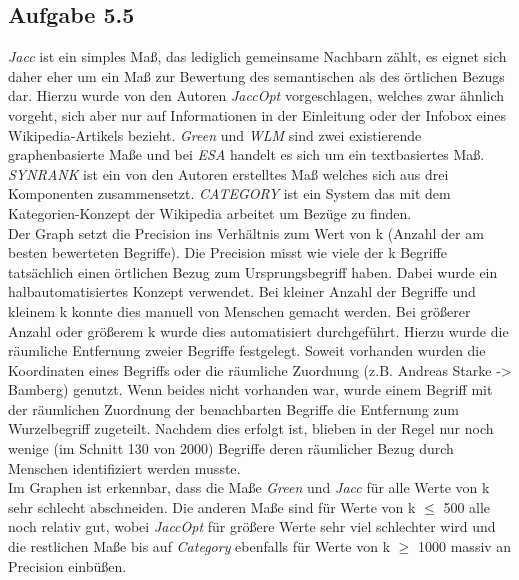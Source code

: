 \subsection*{Aufgabe 5.5}
\textit{Jacc} ist ein simples Maß, das lediglich gemeinsame Nachbarn zählt, es eignet sich daher eher um ein Maß zur Bewertung des semantischen als des örtlichen Bezugs dar. Hierzu wurde von den Autoren \textit{JaccOpt} vorgeschlagen, welches zwar ähnlich vorgeht, sich aber nur auf Informationen in der Einleitung oder der Infobox eines Wikipedia-Artikels bezieht. \textit{Green} und \textit{WLM} sind zwei existierende graphenbasierte Maße und bei \textit{ESA} handelt es sich um ein textbasiertes Maß. \textit{SYNRANK} ist ein von den Autoren erstelltes Maß welches sich aus drei Komponenten zusammensetzt. \textit{CATEGORY} ist ein System das mit dem Kategorien-Konzept der Wikipedia arbeitet um Bezüge zu finden.\\
Der Graph setzt die Precision ins Verhältnis zum Wert von k (Anzahl der am besten bewerteten Begriffe). Die Precision misst wie viele der k Begriffe tatsächlich einen örtlichen Bezug zum Ursprungsbegriff haben. Dabei wurde ein halbautomatisiertes Konzept verwendet. Bei kleiner Anzahl der Begriffe und kleinem k konnte dies manuell von Menschen gemacht werden. Bei größerer Anzahl oder größerem k wurde dies automatisiert durchgeführt. Hierzu wurde die räumliche Entfernung zweier Begriffe festgelegt. Soweit vorhanden wurden die Koordinaten eines Begriffs oder die räumliche Zuordnung (z.B. Andreas Starke -> Bamberg) genutzt. Wenn beides nicht vorhanden war, wurde einem Begriff mit der räumlichen Zuordnung der benachbarten Begriffe die Entfernung zum Wurzelbegriff zugeteilt. Nachdem dies erfolgt ist, blieben in der Regel nur noch wenige (im Schnitt 130 von 2000) Begriffe deren räumlicher Bezug durch Menschen identifiziert werden musste.\\
Im Graphen ist erkennbar, dass die Maße \textit{Green} und \textit{Jacc} für alle Werte von k sehr schlecht abschneiden. Die anderen Maße sind für Werte von k $\leq$ 500 alle noch relativ gut, wobei \textit{JaccOpt} für größere Werte sehr viel schlechter wird und die restlichen Maße bis auf \textit{Category} ebenfalls für Werte von k $\geq $ 1000 massiv an Precision einbüßen.